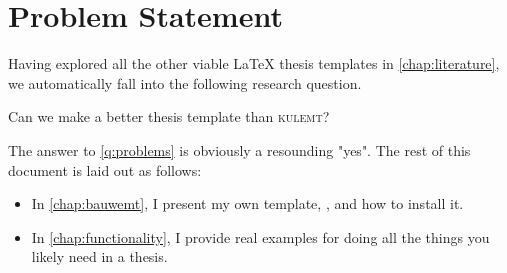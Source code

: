 \chapter{Problem Statement}\label{chap:questions}
Having explored all the other viable \LaTeX{} thesis templates in \autoref{chap:literature}, we automatically fall into the following research question.
\begin{question}\label{q:problems}
	Can we make a better thesis template than \textsc{kulemt}?
\end{question}
The answer to \autoref{q:problems} is obviously a resounding "yes". The rest of this document is laid out as follows:
\begin{itemize}
	\item In \autoref{chap:bauwemt}, I present my own template, \repo, and how to install it.
	\item In \autoref{chap:functionality}, I provide real examples for doing all the things you likely need in a thesis.
\end{itemize}